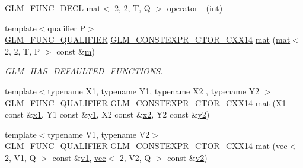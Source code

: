 \begin{DoxyCompactItemize}
\item 
\mbox{\hyperlink{setup_8hpp_ab2d052de21a70539923e9bcbf6e83a51}{G\+L\+M\+\_\+\+F\+U\+N\+C\+\_\+\+D\+E\+CL}} \mbox{\hyperlink{structglm_1_1mat}{mat}}$<$ 2, 2, T, Q $>$ \mbox{\hyperlink{structglm_1_1mat_3_012_00_012_00_01_t_00_01_q_01_4_a281b447bee6e5873f04b693d7178da91}{operator-\/-\/}} (int)
\item 
{\footnotesize template$<$qualifier P$>$ }\\\mbox{\hyperlink{setup_8hpp_a33fdea6f91c5f834105f7415e2a64407}{G\+L\+M\+\_\+\+F\+U\+N\+C\+\_\+\+Q\+U\+A\+L\+I\+F\+I\+ER}} \mbox{\hyperlink{setup_8hpp_a0900f9145e68bf6061b6f5e7be3fa751}{G\+L\+M\+\_\+\+C\+O\+N\+S\+T\+E\+X\+P\+R\+\_\+\+C\+T\+O\+R\+\_\+\+C\+X\+X14}} \mbox{\hyperlink{structglm_1_1mat_3_012_00_012_00_01_t_00_01_q_01_4_a135dbb9a94e04066f09624c6f3ab3b53}{mat}} (\mbox{\hyperlink{structglm_1_1mat}{mat}}$<$ 2, 2, T, P $>$ const \&\mbox{\hyperlink{_s_d_l__opengl__glext_8h_af593500c283bf1a787a6f947f503a5c2}{m}})
\begin{DoxyCompactList}\small\item\em G\+L\+M\+\_\+\+H\+A\+S\+\_\+\+D\+E\+F\+A\+U\+L\+T\+E\+D\+\_\+\+F\+U\+N\+C\+T\+I\+O\+NS. \end{DoxyCompactList}\item 
{\footnotesize template$<$typename X1, typename Y1, typename X2 , typename Y2 $>$ }\\\mbox{\hyperlink{setup_8hpp_a33fdea6f91c5f834105f7415e2a64407}{G\+L\+M\+\_\+\+F\+U\+N\+C\+\_\+\+Q\+U\+A\+L\+I\+F\+I\+ER}} \mbox{\hyperlink{setup_8hpp_a0900f9145e68bf6061b6f5e7be3fa751}{G\+L\+M\+\_\+\+C\+O\+N\+S\+T\+E\+X\+P\+R\+\_\+\+C\+T\+O\+R\+\_\+\+C\+X\+X14}} \mbox{\hyperlink{structglm_1_1mat_3_012_00_012_00_01_t_00_01_q_01_4_a2648b2f4eae0dbdc87ebc1438ef45719}{mat}} (X1 const \&\mbox{\hyperlink{_s_d_l__opengl__glext_8h_a49825216c96caaeb09237b36651181c5}{x1}}, Y1 const \&\mbox{\hyperlink{_s_d_l__opengl__glext_8h_a3af6c78fcdfccea028a5878bc747ef39}{y1}}, X2 const \&\mbox{\hyperlink{_s_d_l__opengl__glext_8h_a7b907a03236685c534d89d604cff23c8}{x2}}, Y2 const \&\mbox{\hyperlink{_s_d_l__opengl__glext_8h_a2be1135ed68e8d80fa9e130c7814f8c2}{y2}})
\item 
{\footnotesize template$<$typename V1, typename V2$>$ }\\\mbox{\hyperlink{setup_8hpp_a33fdea6f91c5f834105f7415e2a64407}{G\+L\+M\+\_\+\+F\+U\+N\+C\+\_\+\+Q\+U\+A\+L\+I\+F\+I\+ER}} \mbox{\hyperlink{setup_8hpp_a0900f9145e68bf6061b6f5e7be3fa751}{G\+L\+M\+\_\+\+C\+O\+N\+S\+T\+E\+X\+P\+R\+\_\+\+C\+T\+O\+R\+\_\+\+C\+X\+X14}} \mbox{\hyperlink{structglm_1_1mat_3_012_00_012_00_01_t_00_01_q_01_4_a57de0b97d240ad056c3aa54425eb8244}{mat}} (\mbox{\hyperlink{structglm_1_1vec}{vec}}$<$ 2, V1, Q $>$ const \&\mbox{\hyperlink{_s_d_l__opengl__glext_8h_a435c176a02c061b43e19bdf7c86cceae}{v1}}, \mbox{\hyperlink{structglm_1_1vec}{vec}}$<$ 2, V2, Q $>$ const \&\mbox{\hyperlink{_s_d_l__opengl__glext_8h_a0928f6d0f0f794ba000a21dfae422136}{v2}})

\end{DoxyCompactItemize}
